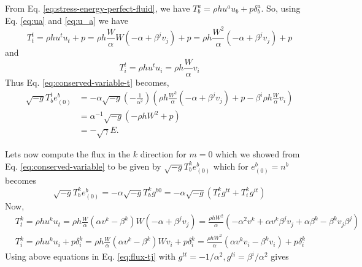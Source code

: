 \documentclass[10pt]{article}
\begin{document}
\begin{enumerate}
  From Eq. \eqref{eq:stress-energy-perfect-fluid}, we have $T^a_b = \rho h u^a u_b + p \delta^a_b$. So, using Eq. \eqref{eq:ua} and \eqref{eq:u_a} we have
  \begin{equation}
    \label{eq:Ttt}
    T^t_t = \rho h u^t u_t + p =  \rho h \frac{W}{\alpha}W(-\alpha + \beta^j v_j) + p = \rho h \frac{W^2}{\alpha}(-\alpha + \beta^j v_j) + p
  \end{equation}
  and
  \begin{equation}
    \label{eq:Tti}
    T^t_i = \rho h u^t u_i = \rho h \frac{W}{\alpha}v_i
  \end{equation}
  Thus Eq. \eqref{eq:conserved-variable-t} becomes,
  \begin{align}
    \label{eq:conserved-variable-tt}
    \sqrt{-g}T^t_b e^b_{(0)}
    & = -\alpha \sqrt{-g}\left(-\frac{1}{\alpha^2}\right)\left(\rho h \frac{W^2}{\alpha}(-\alpha + \beta^j v_j) + p - \beta^i\rho h \frac{W}{\alpha}v_i\right)\\
    & = \alpha^{-1}\sqrt{-g}(- \rho h W^2 + p)\\
    & = \boxed{- \sqrt{\gamma}E}.
  \end{align}

  Lets now compute the flux in the $k$ direction for $m=0$ which we showed from Eq. \eqref{eq:conserved-variable} to be given by $\sqrt{-g}T^k_b e^b_{(0)}$ which for $e^b_{(0)} = n^b$ becomes
  \begin{equation}
    \label{eq:flux-tj}
    \sqrt{-g}T^k_b e^b_{(0)} = -\alpha \sqrt{-g} T^k_b g^{b0} = -\alpha\sqrt{-g}(T^k_t g^{tt} + T^k_i g^{it})
  \end{equation}
  Now,
  \begin{equation}
    \label{eq:Tkt-Tki}
    \begin{aligned}
      & T^k_t = \rho h u^k u_t = \rho h \frac{W}{\alpha}(\alpha v^k - \beta^k)W(-\alpha + \beta^j v_j) = \frac{\rho h W^2}{\alpha}(-\alpha^2 v^k + \alpha v^k \beta^j v_j + \alpha \beta^k - \beta^k v_j \beta^j)\\
      & T^k_i = \rho h u^k u_i + p \delta^k_i = \rho h \frac{W}{\alpha}(\alpha v^k - \beta^k)W v_i + p \delta^k_i = \frac{\rho h W^2}{\alpha}(\alpha v^k v_i - \beta^k v_i) + p \delta^k_i
  \end{aligned}
\end{equation}
Using above equations in Eq. \eqref{eq:flux-tj} with $g^{tt} = -1/\alpha^2, g^{ti} = \beta^i/\alpha^2$ gives


\end{enumerate}
\end{document}
